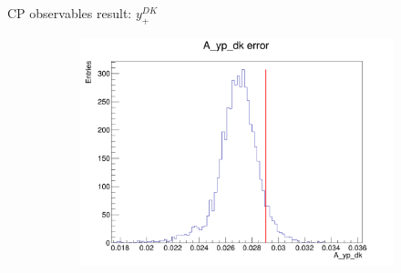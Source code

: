 \documentclass{beamer}
\begin{document}
\begin{frame}{CP observables result: $y_+^{DK}$}
\begin{figure}
\begin{subfigure}{0.42\textwidth}
      \includegraphics[width = 1.0\textwidth]{Plots/A_yp_dk_error_WithDataUncertainty.png}
    \end{subfigure}
  \end{figure}
\end{frame}
\end{document}
